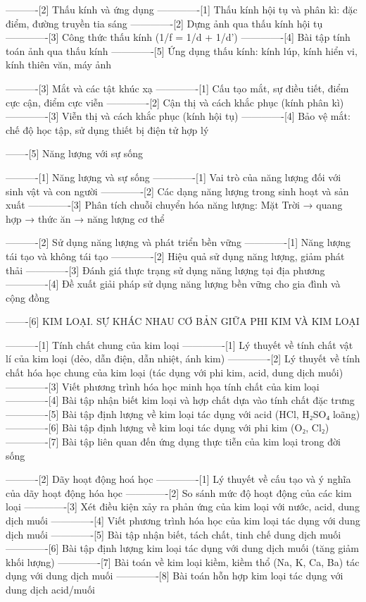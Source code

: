 ----------[2] Thấu kính và ứng dụng
-------------[1] Thấu kính hội tụ và phân kì: đặc điểm, đường truyền tia sáng
-------------[2] Dựng ảnh qua thấu kính hội tụ
-------------[3] Công thức thấu kính (1/f = 1/d + 1/d')
-------------[4] Bài tập tính toán ảnh qua thấu kính
-------------[5] Ứng dụng thấu kính: kính lúp, kính hiển vi, kính thiên văn, máy ảnh

----------[3] Mắt và các tật khúc xạ
-------------[1] Cấu tạo mắt, sự điều tiết, điểm cực cận, điểm cực viễn
-------------[2] Cận thị và cách khắc phục (kính phân kì)
-------------[3] Viễn thị và cách khắc phục (kính hội tụ)
-------------[4] Bảo vệ mắt: chế độ học tập, sử dụng thiết bị điện tử hợp lý

-------[5] Năng lượng với sự sống

----------[1] Năng lượng và sự sống
-------------[1] Vai trò của năng lượng đối với sinh vật và con người
-------------[2] Các dạng năng lượng trong sinh hoạt và sản xuất
-------------[3] Phân tích chuỗi chuyển hóa năng lượng: Mặt Trời → quang hợp → thức ăn → năng lượng cơ thể

----------[2] Sử dụng năng lượng và phát triển bền vững
-------------[1] Năng lượng tái tạo và không tái tạo
-------------[2] Hiệu quả sử dụng năng lượng, giảm phát thải
-------------[3] Đánh giá thực trạng sử dụng năng lượng tại địa phương
-------------[4] Đề xuất giải pháp sử dụng năng lượng bền vững cho gia đình và cộng đồng

-------[6] KIM LOẠI. SỰ KHÁC NHAU CƠ BẢN GIỮA PHI KIM VÀ KIM LOẠI

----------[1] Tính chất chung của kim loại
-------------[1] Lý thuyết về tính chất vật lí của kim loại (dẻo, dẫn điện, dẫn nhiệt, ánh kim)
-------------[2] Lý thuyết về tính chất hóa học chung của kim loại (tác dụng với phi kim, acid, dung dịch muối)
-------------[3] Viết phương trình hóa học minh họa tính chất của kim loại
-------------[4] Bài tập nhận biết kim loại và hợp chất dựa vào tính chất đặc trưng
-------------[5] Bài tập định lượng về kim loại tác dụng với acid (HCl, H₂SO₄ loãng)
-------------[6] Bài tập định lượng về kim loại tác dụng với phi kim (O₂, Cl₂)
-------------[7] Bài tập liên quan đến ứng dụng thực tiễn của kim loại trong đời sống

----------[2] Dãy hoạt động hoá học
-------------[1] Lý thuyết về cấu tạo và ý nghĩa của dãy hoạt động hóa học
-------------[2] So sánh mức độ hoạt động của các kim loại
-------------[3] Xét điều kiện xảy ra phản ứng của kim loại với nước, acid, dung dịch muối
-------------[4] Viết phương trình hóa học của kim loại tác dụng với dung dịch muối
-------------[5] Bài tập nhận biết, tách chất, tinh chế dung dịch muối
-------------[6] Bài tập định lượng kim loại tác dụng với dung dịch muối (tăng giảm khối lượng)
-------------[7] Bài toán về kim loại kiềm, kiềm thổ (Na, K, Ca, Ba) tác dụng với dung dịch muối
-------------[8] Bài toán hỗn hợp kim loại tác dụng với dung dịch acid/muối

